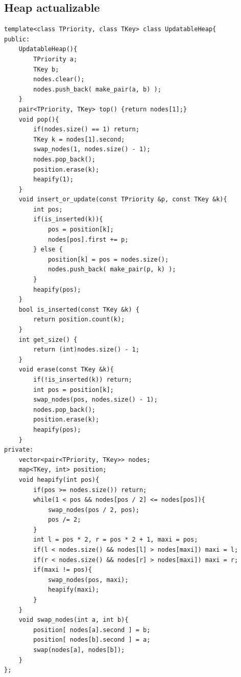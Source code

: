 \documentclass[12 pts,spanish,mexico]{article}
\numberwithin{equation}{section}
\begin{document}
\begin{multicols}{2}
\subsection{Heap actualizable}
\begin{verbatim}
template<class TPriority, class TKey> class UpdatableHeap{
public:
	UpdatableHeap(){
        TPriority a;
        TKey b;
        nodes.clear();
        nodes.push_back( make_pair(a, b) );
    }
    pair<TPriority, TKey> top() {return nodes[1];}
    void pop(){
        if(nodes.size() == 1) return;
        TKey k = nodes[1].second;
        swap_nodes(1, nodes.size() - 1);
        nodes.pop_back();
        position.erase(k);
        heapify(1);
    }
    void insert_or_update(const TPriority &p, const TKey &k){
        int pos;
        if(is_inserted(k)){
            pos = position[k];
            nodes[pos].first += p;
        } else {
            position[k] = pos = nodes.size();
            nodes.push_back( make_pair(p, k) );
        }
        heapify(pos);
    }
    bool is_inserted(const TKey &k) {
        return position.count(k);
    }
    int get_size() {
        return (int)nodes.size() - 1;
    }
    void erase(const TKey &k){
        if(!is_inserted(k)) return;
        int pos = position[k];
        swap_nodes(pos, nodes.size() - 1);
        nodes.pop_back();
        position.erase(k);
        heapify(pos);
    }
private:
    vector<pair<TPriority, TKey>> nodes;
    map<TKey, int> position;
    void heapify(int pos){
        if(pos >= nodes.size()) return;
        while(1 < pos && nodes[pos / 2] <= nodes[pos]){
            swap_nodes(pos / 2, pos);
            pos /= 2;
        }
        int l = pos * 2, r = pos * 2 + 1, maxi = pos;
        if(l < nodes.size() && nodes[l] > nodes[maxi]) maxi = l;
        if(r < nodes.size() && nodes[r] > nodes[maxi]) maxi = r;
        if(maxi != pos){
            swap_nodes(pos, maxi);
            heapify(maxi);
        }
    }
    void swap_nodes(int a, int b){
        position[ nodes[a].second ] = b;
        position[ nodes[b].second ] = a;
        swap(nodes[a], nodes[b]);
    }
};
\end{verbatim}



\end{multicols}
\end{document}
